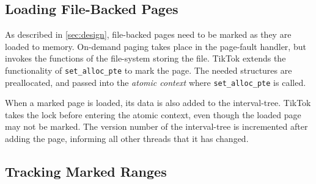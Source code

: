 \documentclass[conference]{IEEEtran}
\newcommand{\sysname}{TikTok}
\begin{document}
\subsection{Loading File-Backed Pages}

As described in \autoref{sec:design}, file-backed pages need to be marked as
they are loaded to memory. On-demand paging takes place in the page-fault
handler, but invokes the functions of the file-system storing the file. \sysname{}
extends the functionality of \texttt{set\_alloc\_pte} to mark the page. The
needed structures are preallocated, and passed into the \emph{atomic context} where 
\texttt{set\_alloc\_pte} is called.

When a marked page is loaded, its data is also added to the interval-tree.
\sysname{} takes the lock before entering the atomic context, even though the
loaded page may not be marked. The version number of the interval-tree is
incremented after adding the page, informing all other threads that it has
changed.

\subsection{Tracking Marked Ranges}
\end{document}
